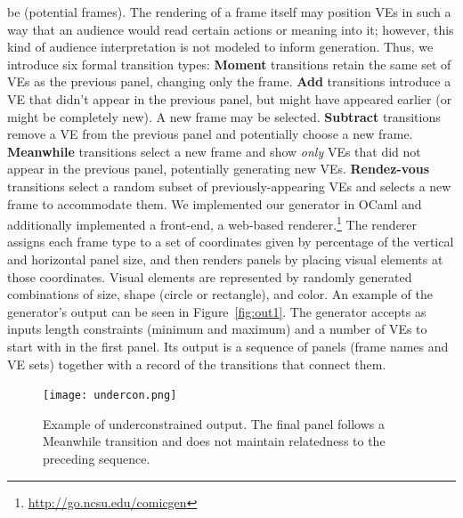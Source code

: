 be (potential frames). The rendering of a frame itself may position VEs in
such a way that an audience would read certain actions or meaning into it;
however, this kind of audience interpretation is not modeled to inform
generation.
%
%
Thus, we introduce six formal transition types: 
{\bf Moment} transitions retain the same set of VEs as the previous panel, 
changing only the frame.
{\bf Add} transitions introduce a VE that didn't appear in the
previous panel, but might have appeared earlier (or might be completely
new). A new frame may be selected.
{\bf Subtract} transitions remove a VE from the previous panel and
potentially choose a new frame.
{\bf Meanwhile} transitions select a new frame and show {\em only}
VEs that did not appear in the previous panel, potentially generating new
VEs.
{\bf Rendez-vous} transitions select a random subset of
previously-appearing VEs 
and selects a new frame to accommodate them.
%
We implemented our generator in OCaml and additionally implemented a
front-end, a web-based renderer.\footnote{\url{http://go.ncsu.edu/comicgen}} The
renderer assigns each frame type to a set of coordinates given by
percentage of the vertical and horizontal panel size, and then renders
panels by placing visual elements at those coordinates. Visual elements are
represented by randomly generated combinations of size, shape (circle or
rectangle), and color.  An example of the generator's output can be seen in
Figure~\ref{fig:out1}. 
The generator accepts as inputs length constraints (minimum and maximum)
and a number of VEs to start with in the first panel. Its output is a
sequence of panels (frame names and VE sets) together with a record of the
transitions that connect them.

\begin{figure}[b]
\centering
\texttt{[image: undercon.png]}
\caption{Example of underconstrained output. The final panel follows a
Meanwhile transition and does not
maintain relatedness to the preceding sequence.}
\label{fig:outbad}
\end{figure}

